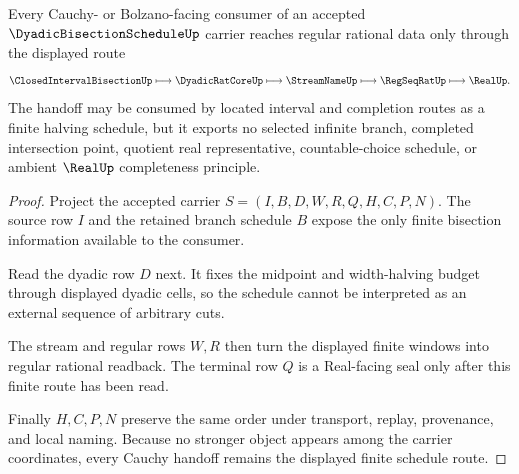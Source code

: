 \begin{theorem}
\label{thm:dyadic-bisection-schedule-cauchy-handoff}
Every Cauchy- or Bolzano-facing consumer of an accepted $\DyadicBisectionScheduleUp$ carrier reaches regular rational data only through the displayed route
$$
\ClosedIntervalBisectionUp
\longmapsto
\DyadicRatCoreUp
\longmapsto
\StreamNameUp
\longmapsto
\RegSeqRatUp
\longmapsto
\RealUp .
$$
The handoff may be consumed by located interval and completion routes as a finite halving schedule, but it exports no selected infinite branch, completed intersection point, quotient real representative, countable-choice schedule, or ambient $\RealUp$ completeness principle.
\end{theorem}
\begin{proof}
Project the accepted carrier $S=(I,B,D,W,R,Q,H,C,P,N)$. The source row $I$ and the retained branch schedule $B$ expose the only finite bisection information available to the consumer.

Read the dyadic row $D$ next. It fixes the midpoint and width-halving budget through displayed dyadic cells, so the schedule cannot be interpreted as an external sequence of arbitrary cuts.

The stream and regular rows $W,R$ then turn the displayed finite windows into regular rational readback. The terminal row $Q$ is a Real-facing seal only after this finite route has been read.

Finally $H,C,P,N$ preserve the same order under transport, replay, provenance, and local naming. Because no stronger object appears among the carrier coordinates, every Cauchy handoff remains the displayed finite schedule route.
\end{proof}




